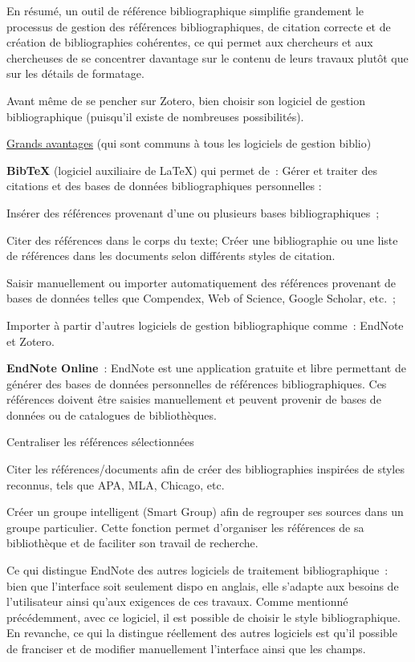 \documentclass[
  letterpaper,
]{scrbook}
\begin{document}
En résumé, un outil de référence bibliographique simplifie grandement le
processus de gestion des références bibliographiques, de citation
correcte et de création de bibliographies cohérentes, ce qui permet aux
chercheurs et aux chercheuses de se concentrer davantage sur le contenu
de leurs travaux plutôt que sur les détails de formatage.

Avant même de se pencher sur Zotero, bien choisir son logiciel de
gestion bibliographique (puisqu'il existe de nombreuses possibilités).

\ul{Grands avantages} (qui sont communs à tous les logiciels de gestion
biblio)

\textbf{BibTeX} (logiciel auxiliaire de LaTeX) qui permet de~: Gérer et
traiter des citations et des bases de données bibliographiques
personnelles :

Insérer des références provenant d'une ou plusieurs bases
bibliographiques~;

Citer des références dans le corps du texte; Créer une bibliographie ou
une liste de références dans les documents selon différents styles de
citation.

Saisir manuellement ou importer automatiquement des références provenant
de bases de données telles que Compendex, Web of Science, Google
Scholar, etc.~;

Importer à partir d'autres logiciels de gestion bibliographique comme~:
EndNote et Zotero.

\textbf{EndNote Online}~: EndNote est une application gratuite et libre
permettant de générer des bases de données personnelles de références
bibliographiques. Ces références doivent être saisies manuellement et
peuvent provenir de bases de données ou de catalogues de bibliothèques.

Centraliser les références sélectionnées

Citer les références/documents afin de créer des bibliographies
inspirées de styles reconnus, tels que APA, MLA, Chicago, etc.

Créer un groupe intelligent (Smart Group) afin de regrouper ses sources
dans un groupe particulier. Cette fonction permet d'organiser les
références de sa bibliothèque et de faciliter son travail de recherche.

Ce qui distingue EndNote des autres logiciels de traitement
bibliographique~: bien que l'interface soit seulement dispo en anglais,
elle s'adapte aux besoins de l'utilisateur ainsi qu'aux exigences de ces
travaux. Comme mentionné précédemment, avec ce logiciel, il est possible
de choisir le style bibliographique. En revanche, ce qui la distingue
réellement des autres logiciels est qu'il possible de franciser et de
modifier manuellement l'interface ainsi que les champs.
\end{document}
